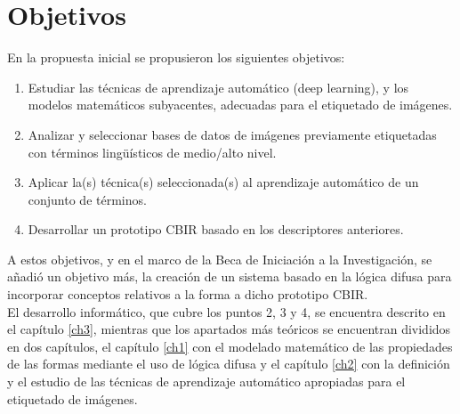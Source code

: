 \section{Objetivos}

En la propuesta inicial se propusieron los siguientes objetivos:

\begin{enumerate}
\item Estudiar las técnicas de aprendizaje automático (deep learning), y los modelos matemáticos subyacentes, adecuadas para el etiquetado de imágenes.
\item Analizar y seleccionar bases de datos de imágenes previamente etiquetadas con términos lingüísticos de medio/alto nivel.
\item Aplicar la(s) técnica(s) seleccionada(s) al aprendizaje automático de un conjunto de términos.
\item Desarrollar un prototipo CBIR basado en los descriptores anteriores.
\end{enumerate}

A estos objetivos, y en el marco de la Beca de Iniciación a la Investigación, se añadió un objetivo más, la creación de un sistema basado en la lógica difusa para incorporar conceptos relativos a la forma a dicho prototipo CBIR.\\

El desarrollo informático, que cubre los puntos 2, 3 y 4, se encuentra descrito en el capítulo \ref{ch3}, mientras que los apartados más teóricos se encuentran divididos en dos capítulos, el capítulo \ref{ch1} con el modelado matemático de las propiedades de las formas mediante el uso de lógica difusa y el capítulo \ref{ch2} con la definición y el estudio de las técnicas de aprendizaje automático apropiadas para el etiquetado de imágenes.\\